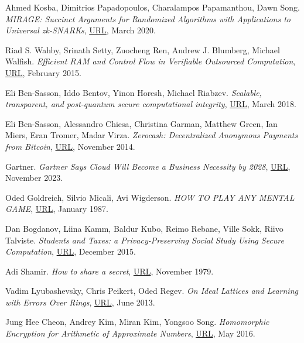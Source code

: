 \documentclass{Resources/UoBLab1}
\theoremstyle{definition}
\begin{document}
\begin{thebibliography}{10}
 Ahmed Kosba, Dimitrios Papadopoulos, Charalampos Papamanthou, Dawn Song. \textit{MIRAGE: Succinct Arguments for Randomized Algorithms with Applications to Universal zk-SNARKs}, \href{https://eprint.iacr.org/2020/278.pdf}{URL}, March 2020.

 Riad S. Wahby, Srinath Setty, Zuocheng Ren, Andrew J. Blumberg, Michael Walfish. \textit{Efficient RAM and Control Flow in Verifiable Outsourced Computation}, \href{https://www.ndss-symposium.org/wp-content/uploads/2017/09/07_3_2.pdf}{URL}, February 2015.

 Eli Ben-Sasson, Iddo Bentov, Yinon Horesh, Michael Riabzev. \textit{Scalable, transparent, and post-quantum secure computational integrity}, \href{https://eprint.iacr.org/2018/046.pdf}{URL}, March 2018.

 Eli Ben-Sasson, Alessandro Chiesa, Christina Garman, Matthew Green, Ian Miers, Eran Tromer, Madar Virza. \textit{Zerocash: Decentralized Anonymous Payments from Bitcoin}, \href{https://ieeexplore.ieee.org/stamp/stamp.jsp?tp=&arnumber=6956581}{URL}, November 2014.

 Gartner. \textit{Gartner Says Cloud Will Become a Business Necessity by 2028}, \href{https://www.gartner.com/en/newsroom/press-releases/2023-11-29-gartner-says-cloud-will-become-a-business-necessity-by-2028}{URL}, November 2023.

 Oded Goldreich, Silvio Micali, Avi Wigderson. \textit{HOW TO PLAY ANY MENTAL GAME}, \href{https://dl.acm.org/doi/pdf/10.1145/28395.28420}{URL}, January 1987.

 Dan Bogdanov, Liina Kamm, Baldur Kubo, Reimo Rebane, Ville Sokk, Riivo Talviste. \textit{Students and Taxes: a Privacy-Preserving Social Study Using Secure Computation}, \href{https://eprint.iacr.org/2015/1159.pdf}{URL}, December 2015.

 Adi Shamir. \textit{How to share a secret}, \href{https://dl.acm.org/doi/pdf/10.1145/359168.359176}{URL}, November 1979.

 Vadim Lyubashevsky, Chris Peikert, Oded Regev. \textit{On Ideal Lattices and Learning with Errors Over Rings}, \href{https://eprint.iacr.org/2012/230.pdf}{URL}, June 2013.

 Jung Hee Cheon, Andrey Kim, Miran Kim, Yongsoo Song. \textit{Homomorphic Encryption for Arithmetic of Approximate Numbers}, \href{https://eprint.iacr.org/2016/421.pdf}{URL}, May 2016.


\end{thebibliography}
\end{document}
